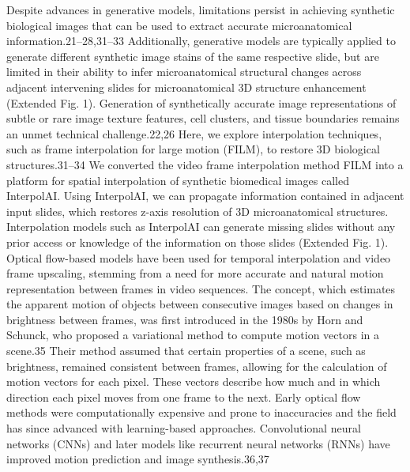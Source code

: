 \begin{refsection}
    Despite advances in generative models, limitations persist in achieving synthetic biological images that can be used to extract accurate microanatomical information.21–28,31–33 Additionally, generative models are typically applied to generate different synthetic image stains of the same respective slide, but are limited in their ability to infer microanatomical structural changes across adjacent intervening slides for microanatomical 3D structure enhancement (Extended Fig. 1). Generation of synthetically accurate image representations of subtle or rare image texture features, cell clusters, and tissue boundaries remains an unmet technical challenge.22,26 Here, we explore interpolation techniques, such as frame interpolation for large motion (FILM), to restore 3D biological structures.31–34 We converted the video frame interpolation method FILM into a platform for spatial interpolation of synthetic biomedical images called InterpolAI. Using InterpolAI, we can propagate information contained in adjacent input slides, which restores z-axis resolution of 3D microanatomical structures. Interpolation models such as InterpolAI can generate missing slides without any prior access or knowledge of the information on those slides (Extended Fig. 1).
    Optical flow-based models have been used for temporal interpolation and video frame upscaling, stemming from a need for more accurate and natural motion representation between frames in video sequences. The concept, which estimates the apparent motion of objects between consecutive images based on changes in brightness between frames, was first introduced in the 1980s by Horn and Schunck, who proposed a variational method to compute motion vectors in a scene.35 Their method assumed that certain properties of a scene, such as brightness, remained consistent between frames, allowing for the calculation of motion vectors for each pixel. These vectors describe how much and in which direction each pixel moves from one frame to the next. Early optical flow methods were computationally expensive and prone to inaccuracies and the field has since advanced with learning-based approaches. Convolutional neural networks (CNNs) and later models like recurrent neural networks (RNNs) have improved motion prediction and image synthesis.36,37

\end{refsection}
